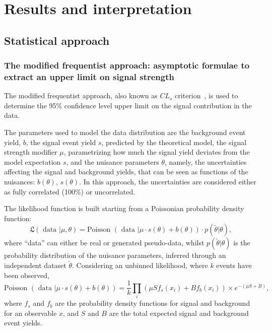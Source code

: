 \section{Results and interpretation}
\label{sec:results}

\subsection{Statistical approach}

\subsubsection{The modified frequentist approach: asymptotic formulae to extract an upper limit on signal strength}

The modified frequentist approach, also known as $CL_s$ criterion~\cite{bib:CLS1,bib:CLS2,bib:LHC-HCG-Report}, is used to determine the 95\% confidence level upper limit on the signal contribution in the data.%

\noindent The parameters used to model the data distribution are the background event yield, $b$, the signal event yield $s$, predicted by the theoretical model, the signal strength modifier $\mu$, parametrizing how much the signal yield deviates from the model expectation $s$, and the nuisance parameters $\theta$, namely, the uncertainties affecting the signal and background yields, that can be seen as functions of the nuisances: $b(\theta)$, $s(\theta)$. In this approach, the uncertainties are considered either as fully correlated (100\%) or uncorrelated.

\noindent The likelihood function is built starting from a Poissonian probability density function:
\begin{equation}
\mathfrak{L} (\text{ data }| \mu, \theta) = \text{Poisson } (\text{ data } | \mu \cdot s(\theta) + b(\theta)) \cdot p (\tilde{\theta}| \theta),
\label{eq:likelihood}
\end{equation}
where ``data'' can either be real or generated pseudo-data, whilst $p (\tilde{\theta}| \theta)$ is the probability distribution of the nuisance parameters, inferred through an independent dataset $\tilde{\theta}$. Considering an unbinned likelihood, where $k$ events have been observed,
\begin{equation}
\text{Poisson } (\text{ data } | \mu \cdot s(\theta) + b(\theta)) = \frac{1}{k} \prod_i \left( \mu S f_s(x_i) + B f_b (x_i) \right) \times e^{- (\mu S + B)},
\end{equation}
where $f_s$ and $f_b$ are the probability density functions for signal and background for an observable $x$, and $S$ and $B$ are the total expected signal and background event yields.

